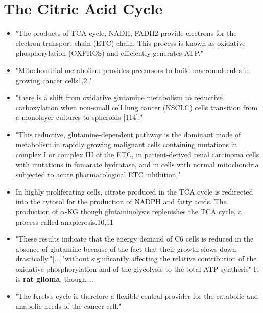 \documentclass[11pt,a4paper]{article}
\begin{document}
\section{The Citric Acid Cycle}
\begin{itemize}
\item "The products of TCA cycle, NADH, FADH2 provide electrons for the electron transport chain (ETC) chain. This process is known as oxidative phosphorylation (OXPHOS) and efficiently generates ATP."\cite{Mudassar2020}
\item "Mitochondrial metabolism provides precursors to build macromolecules in growing cancer cells1,2." \cite{Mullen2011} 
\item "there is a shift from oxidative glutamine metabolism to reductive carboxylation when non-small cell lung cancer (NSCLC) cells transition from a monolayer cultures to spheroids [114]." \cite{Natarajan2019}\cite{Jiang2016}
\item "This reductive, glutamine-dependent pathway is the dominant mode of metabolism in rapidly growing malignant cells containing mutations in complex I or complex III of the ETC, in patient-derived renal carcinoma cells with mutations in fumarate hydratase, and in cells with normal mitochondria subjected to acute pharmacological ETC inhibition." \cite{Mullen2011}
\item  In highly proliferating cells, citrate produced in the TCA cycle is redirected into the cytosol for the production of
NADPH and fatty acids. The production of $\alpha$-KG though glutaminolysis replenishes
the TCA cycle, a process called anaplerosis.10,11 \cite{Villar2015}
\item  "These results indicate that the energy demand of C6 cells is reduced in the absence of glutamine because of the fact that their growth slows down drastically."[...]"without significantly affecting the relative contribution of the oxidative phosphorylation and of the glycolysis to the total ATP synthesis" It  is \textbf{rat glioma}, though....\cite{Martin1999}
\item "The Kreb's cycle is therefore a flexible central provider for the catabolic and anabolic needs of the cancer cell."\cite{Strickland2017}
\end{itemize}
\end{document}
